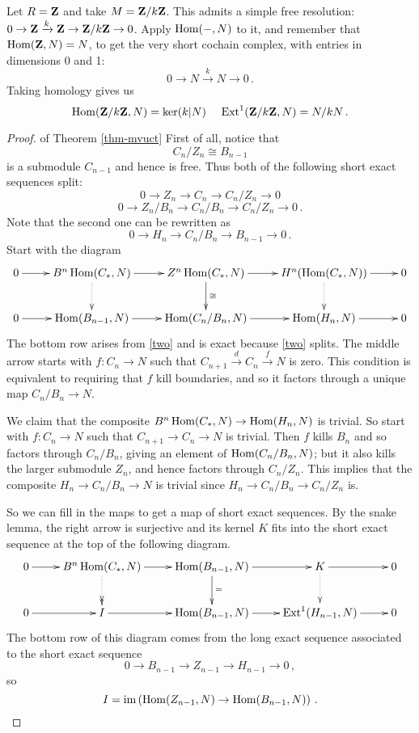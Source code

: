 \begin{example}
Let $R=\mathbf Z$ and take $M=\mathbf Z/k\mathbf Z$. This admits a simple free resolution:
$0\to \mathbf Z\xrightarrow{k}\mathbf Z\to\mathbf Z/k\mathbf Z\to 0$. Apply $\operatorname{Hom}(-,N)$ to it,
and remember that $\operatorname{Hom}(\mathbf Z,N)=N$, to get 
the very short cochain complex, with entries in dimensions 0 and 1:
\[
0\to N\xrightarrow{k} N\to0\,.
\]
Taking homology gives us
\[
\operatorname{Hom}(\mathbf Z/k\mathbf Z,N)=\ker(k|N)\,\quad\operatorname{Ext}^1(\mathbf Z/k\mathbf Z,N)=N/kN\,.
\]
\end{example}



\begin{proof} of Theorem \ref{thm-mvuct}
First of all, notice that 
\[
C_n/Z_n\cong B_{n-1}
\]
is a submodule $C_{n-1}$ and hence is free. Thus both of the following short
exact sequences split:
\begin{equation}
0\to Z_n\to C_n\to C_n/Z_n\to0
\label{one}
\end{equation}
\begin{equation}
0\to Z_n/B_n\to C_n/B_n\to C_n/Z_n\to0\,.
\label{two}
\end{equation}
Note that the second one can be rewritten as
\begin{equation*}
0\to H_n\to C_n/B_n\to B_{n-1}\to0\,.
\end{equation*}
Start with the diagram
\[
\xymatrix{
0 \ar[r] & B^n\Hom(C_*,N) \ar[r] \ar@{.>}[d] & Z^n\Hom(C_*,N) \ar[d]^\cong \ar[r]
& H^n(\Hom(C_*,N)) \ar@{.>}[d] \ar[r] & 0\\
0 \ar[r] & \Hom(B_{n-1},N) \ar[r] & \Hom(C_n/B_n,N) \ar[r] & 
\Hom(H_n,N) \ar[r] & 0
}\]
The bottom row arises from \eqref{two} and is exact because 
\eqref{two} splits.
The middle arrow starts with $f:C_n\to N$ such that 
$C_{n+1}\xrightarrow{d}C_n\xrightarrow{f}N$ 
is zero. This condition is equivalent to requiring that $f$ kill boundaries,
and so it factors through a unique map $C_n/B_n\to N$. 

We claim that the composite $B^n\operatorname{Hom}(C_*,N)\to\operatorname{Hom}(H_n,N)$ is trivial.
So start with $f:C_n\to N$ such that $C_{n+1}\to C_n\to N$ is trivial. 
Then $f$ kills $B_n$ and so factors through $C_n/B_n$, giving an element 
of $\operatorname{Hom}(C_n/B_n,N)$; but it also kills the larger submodule $Z_n$, and
hence factors through $C_n/Z_n$. This implies that the composite
$H_n\to C_n/B_n\to N$ is trivial since $H_n\to C_n/B_n\to C_n/Z_n$ is. 

So we can fill in the maps to get a map of short exact sequences. By the
snake lemma, the right arrow is surjective and its kernel $K$ fits into the 
short exact sequence at the top of the following diagram.
\[
\xymatrix{
0 \ar[r] & B^n\Hom(C_*,N) \ar[r] \ar@{.>>}[d] & \Hom(B_{n-1},N) \ar[d]^= \ar[r]
& K \ar[r] \ar@{.>}[d] & 0 \\
0 \ar[r] & I \ar[r] & \Hom(B_{n-1},N) \ar[r] & \Ext^1(H_{n-1},N) \ar[r] & 0 
}\]
The bottom row of this diagram comes from the long exact sequence 
associated to the short exact sequence 
\[
0\to B_{n-1}\to Z_{n-1}\to H_{n-1}\to0\,,
\]
so
\[
I=\operatorname{im}\left(\operatorname{Hom}(Z_{n-1},N)\to\operatorname{Hom}(B_{n-1},N)\right)\,.
\]


\end{proof}

